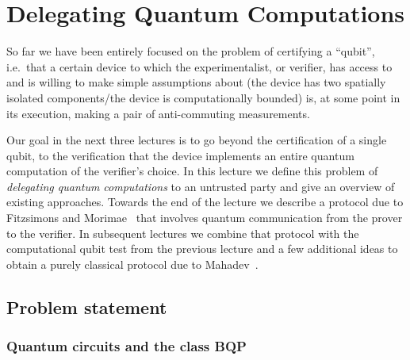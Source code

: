 \chapter{Delegating Quantum Computations}


So far we have been entirely focused on the problem of certifying a ``qubit'', i.e.\ that a certain device to which the experimentalist, or verifier, has access to and is willing to make simple assumptions about (the device has two spatially isolated components/the device is computationally bounded) is, at some point in its execution, making a pair of anti-commuting measurements. 

Our goal in the next three lectures is to go beyond the certification of a single qubit, to the verification that the device implements an entire quantum computation of the verifier's choice. In this lecture we define this problem of \emph{delegating quantum computations} to an untrusted party and give an overview of existing approaches. Towards the end of the lecture we describe a protocol due to Fitzsimons and Morimae~\cite{morimae2016post} that involves quantum communication from the prover to the verifier. In subsequent lectures we combine that protocol with the computational qubit test from the previous lecture and a few additional ideas to obtain a purely classical protocol due to Mahadev~\cite{mahadev2018classical}.  


\section{Problem statement}


\subsection{Quantum circuits and the class BQP}

